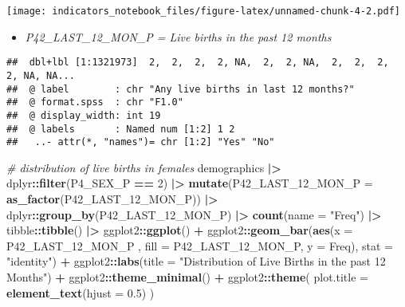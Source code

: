 \documentclass[
]{article}
\newenvironment{Shaded}{\begin{snugshade}}{\end{snugshade}}
\newcommand{\AttributeTok}[1]{\textcolor[rgb]{0.13,0.29,0.53}{#1}}
\newcommand{\CommentTok}[1]{\textcolor[rgb]{0.56,0.35,0.01}{\textit{#1}}}
\newcommand{\DecValTok}[1]{\textcolor[rgb]{0.00,0.00,0.81}{#1}}
\newcommand{\FloatTok}[1]{\textcolor[rgb]{0.00,0.00,0.81}{#1}}
\newcommand{\FunctionTok}[1]{\textcolor[rgb]{0.13,0.29,0.53}{\textbf{#1}}}
\newcommand{\NormalTok}[1]{#1}
\newcommand{\SpecialCharTok}[1]{\textcolor[rgb]{0.81,0.36,0.00}{\textbf{#1}}}
\newcommand{\StringTok}[1]{\textcolor[rgb]{0.31,0.60,0.02}{#1}}
\providecommand{\tightlist}{%
  \setlength{\itemsep}{0pt}\setlength{\parskip}{0pt}}
\begin{document}
\texttt{[image: indicators\_notebook\_files/figure-latex/unnamed-chunk-4-2.pdf]}

\begin{itemize}
\tightlist
\item
  \emph{P42\_LAST\_12\_MON\_P = Live births in the past 12 months}
\end{itemize}

\begin{Shaded}
\end{Shaded}

\begin{verbatim}
##  dbl+lbl [1:1321973]  2,  2,  2,  2, NA,  2,  2, NA,  2,  2,  2,  2, NA, NA...
##  @ label        : chr "Any live births in last 12 months?"
##  @ format.spss  : chr "F1.0"
##  @ display_width: int 19
##  @ labels       : Named num [1:2] 1 2
##   ..- attr(*, "names")= chr [1:2] "Yes" "No"
\end{verbatim}

\begin{Shaded}
\begin{Highlighting}[]
\CommentTok{\# distribution of live births in females}
\NormalTok{demographics }\SpecialCharTok{|\textgreater{}}
\NormalTok{  dplyr}\SpecialCharTok{::}\FunctionTok{filter}\NormalTok{(P4\_SEX\_P }\SpecialCharTok{==} \DecValTok{2}\NormalTok{) }\SpecialCharTok{|\textgreater{}}
  \FunctionTok{mutate}\NormalTok{(}\AttributeTok{P42\_LAST\_12\_MON\_P =} \FunctionTok{as\_factor}\NormalTok{(P42\_LAST\_12\_MON\_P)) }\SpecialCharTok{|\textgreater{}}
\NormalTok{  dplyr}\SpecialCharTok{::}\FunctionTok{group\_by}\NormalTok{(P42\_LAST\_12\_MON\_P) }\SpecialCharTok{|\textgreater{}}
  \FunctionTok{count}\NormalTok{(}\AttributeTok{name =} \StringTok{"Freq"}\NormalTok{) }\SpecialCharTok{|\textgreater{}}
\NormalTok{  tibble}\SpecialCharTok{::}\FunctionTok{tibble}\NormalTok{() }\SpecialCharTok{|\textgreater{}}
\NormalTok{  ggplot2}\SpecialCharTok{::}\FunctionTok{ggplot}\NormalTok{() }\SpecialCharTok{+}
\NormalTok{  ggplot2}\SpecialCharTok{::}\FunctionTok{geom\_bar}\NormalTok{(}\FunctionTok{aes}\NormalTok{(}\AttributeTok{x =}\NormalTok{ P42\_LAST\_12\_MON\_P , }\AttributeTok{fill =}\NormalTok{ P42\_LAST\_12\_MON\_P, }\AttributeTok{y =}\NormalTok{ Freq), }
                    \AttributeTok{stat =} \StringTok{"identity"}\NormalTok{) }\SpecialCharTok{+}
\NormalTok{  ggplot2}\SpecialCharTok{::}\FunctionTok{labs}\NormalTok{(}\AttributeTok{title =} \StringTok{"Distribution of Live Births in the past 12 Months"}\NormalTok{) }\SpecialCharTok{+}
\NormalTok{  ggplot2}\SpecialCharTok{::}\FunctionTok{theme\_minimal}\NormalTok{() }\SpecialCharTok{+}
\NormalTok{  ggplot2}\SpecialCharTok{::}\FunctionTok{theme}\NormalTok{(}
    \AttributeTok{plot.title =} \FunctionTok{element\_text}\NormalTok{(}\AttributeTok{hjust =} \FloatTok{0.5}\NormalTok{)}
\NormalTok{  )}
\end{Highlighting}
\end{Shaded}
\end{document}
